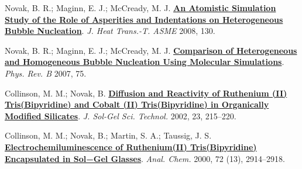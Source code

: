 \begin{cventries}
{\begin{cvitems}
        \item{Novak, B. R.; Maginn, E. J.; McCready, M. J. \href{https://doi.org/10.1115/1.2818771}{\textbf{An Atomistic Simulation Study of the Role of Asperities and Indentations on Heterogeneous Bubble Nucleation}}. \textit{J. Heat Trans.-T. ASME} 2008, 130.}
        \item{Novak, B. R.; Maginn, E. J.; McCready, M. J. \href{https://doi.org/10.1103/PhysRevB.75.085413}{\textbf{Comparison of Heterogeneous and Homogeneous Bubble Nucleation Using Molecular Simulations}}. \textit{Phys. Rev. B} 2007, 75. }
        \item{Collinson, M. M.; Novak, B. \href{https://doi.org/10.1023/A:1013966629311}{\textbf{Diffusion and Reactivity of Ruthenium (II) Tris(Bipyridine) and Cobalt (II) Tris(Bipyridine) in Organically Modified Silicates}}. \textit{J. Sol-Gel Sci. Technol.} 2002, 23, 215–220.}
        \item{Collinson, M. M.; Novak, B.; Martin, S. A.; Taussig, J. S. \href{https://doi.org/10.1021/ac9913208}{\textbf{Electrochemiluminescence of Ruthenium(II) Tris(Bipyridine) Encapsulated in Sol−Gel Glasses}}. \textit{Anal. Chem.} 2000, 72 (13), 2914–2918.}        
      \end{cvitems}
    }
    

\end{cventries}
